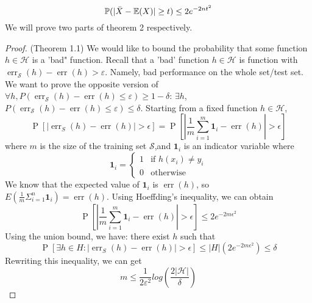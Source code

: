 \begin{equation*}
    \mathbb{P}(|\Bar{X}-\mathbb{E}(X)| \geq t) \leq 2e^{-2nt^{2}}
\end{equation*}
We will prove two parts of theorem 2 respectively. 
\begin{proof}{(Theorem 1.1)}
 We would like to bound the probability that some function $h\in \mathcal{H}$ is a 'bad" function. Recall that a 'bad' function $h\in \mathcal{H}$ is function with $\operatorname{err}_{\mathcal{S}}(h) - \operatorname{err}(h) > \varepsilon$. Namely, bad performance on the whole set/test set. We want to prove the opposite version of $\forall h, P(\operatorname{err}_{\mathcal{S}}(h)-\operatorname{err}(h) \leq \varepsilon) \geq 1 - \delta$: $\exists h$, $P(\operatorname{err}_{\mathcal{S}}(h)-\operatorname{err}(h) \leq \varepsilon) \leq \delta$. Starting from a fixed function $h\in \mathcal{H}$, 
 \begin{equation*}
     \operatorname{P}\left[\left|\operatorname{err}_{S}(h)-\operatorname{err}(h)\right|>\epsilon\right]=\operatorname{P}\left[\left|\frac{1}{m} \sum_{i=1}^{m} \mathbf{1}_{i}-\operatorname{err}(h)\right|>\epsilon\right]
 \end{equation*}
 where $m$ is the size of the training set $\mathcal{S}$,and $\mathbf{1}_{i}$ is an indicator variable where 
 \[
  \mathbf{1}_{i} =
  \begin{cases}
                                   1 & \text{if $h(x_{i}) \neq  y_{i}$} \\
                                   0 & \text{otherwise} 
  \end{cases}
\]
We know that the expected value of $\mathbf{1}_{i}$ is $\operatorname{err}(h)$, so $E(\frac{1}{m}\Sigma_{i=1}^{n}\mathbf{1}_{i}) = \operatorname{err}(h)$. Using Hoeffding's inequality, we can obtain 
\begin{equation*}
    \operatorname{P}\left[\left|\frac{1}{m} \sum_{i=1}^{m} \mathbf{1}_{i}-\operatorname{err}(h)\right|>\epsilon\right] \leq 2 e^{-2 m \epsilon^{2}}
\end{equation*}
Using the union bound, we have: there exist $h$ such that
\begin{equation*}
    \operatorname{P}\left[\exists h \in H:\left|\operatorname{err}_{S}(h)-\operatorname{err}(h)\right|>\epsilon\right] \leq|H|\left(2 e^{-2 m \epsilon^{2}}\right) \leq \delta
\end{equation*}
Rewriting this inequality, we can get
\begin{equation*}
    m \leq \frac{1}{2\varepsilon^{2}}log(\frac{2|\mathcal{H}|}{\delta})
\end{equation*}
\end{proof}

